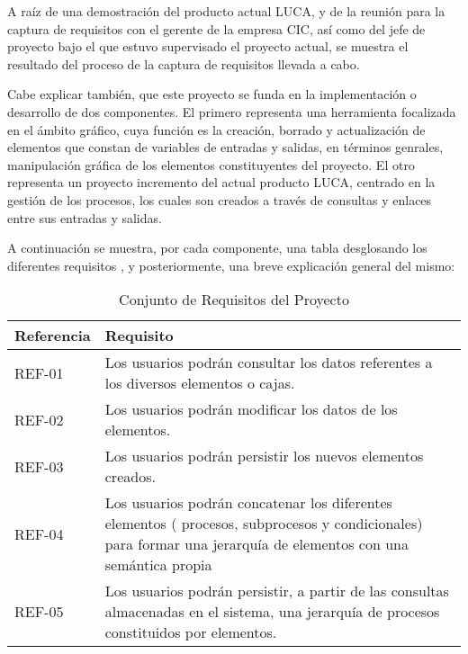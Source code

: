 A raíz de una demostración del producto actual LUCA, y de la reunión para la captura de requisitos con el gerente de la empresa CIC, así como del jefe de proyecto bajo el que estuvo supervisado el proyecto actual, se muestra el resultado del proceso de la captura de requisitos llevada a cabo.
		
Cabe explicar también, que este proyecto se funda en la implementación o desarrollo de dos componentes. El primero representa una herramienta focalizada en el ámbito gráfico, cuya función es la creación, borrado y actualización de elementos que constan de variables de entradas y salidas, en términos genrales, manipulación gráfica de los elementos constituyentes del proyecto. El otro representa un proyecto incremento del actual producto LUCA, centrado en la gestión de los procesos, los cuales son creados a través de consultas y enlaces entre sus entradas y salidas.


		
A continuación se muestra, por cada componente, una tabla desglosando los diferentes requisitos , y posteriormente, una breve explicación general del mismo:
		
\begin{table}[H]
    \begin{center}
	   \begin{tabular}{|l|l|}
		  \hline
		  Referencia & Requisito \\
		  \hline \hline
		  REF-01 & Los usuarios podrán consultar los datos referentes a los diversos elementos o cajas. \\ \hline
		  REF-02 & Los usuarios podrán modificar los datos de los elementos. \\ \hline
		  REF-03 & Los usuarios podrán persistir los nuevos elementos creados. \\ \hline
		  REF-04 & Los usuarios podrán concatenar los diferentes elementos ( procesos, subprocesos y condicionales) para formar una jerarquía de elementos con una semántica propia\\ \hline
		  REF-05 & Los usuarios podrán persistir, a partir de las consultas almacenadas en el sistema, una jerarquía de procesos constituidos por elementos. \\ \hline
        \end{tabular}
		\caption{Conjunto de Requisitos del Proyecto}
		\label{tabla:requisitosProceso}
	\end{center}
\end{table}

